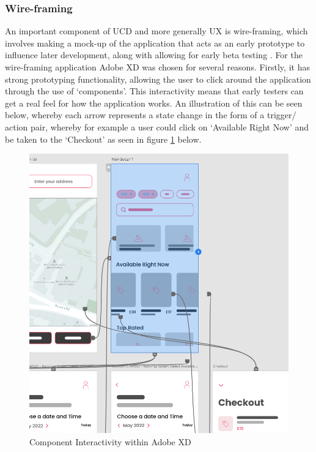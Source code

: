 \documentclass[12pt]{article}
\begin{document}
	\subsubsection{Wire-framing}
	An important component of UCD and more generally UX is wire-framing, which involves making a mock-up of the application that acts as an early prototype to influence later development, along with allowing for early beta testing \cite{Arnowitz Arent Berger}. For the wire-framing application Adobe XD was chosen for several reasons. Firstly, it has strong prototyping functionality, allowing the user to click around the application through the use of ‘components’. This interactivity means that early testers can get a real feel for how the application works. An illustration of this can be seen below, whereby each arrow represents a state change in the form of a trigger/ action pair, whereby for example a user could click on ‘Available Right Now’ and be taken to the ‘Checkout’ as seen in figure \ref{fig:prot-comp} below.
	\begin{figure}[H]
		\centering
		\includegraphics[scale=0.5]{images/prototyping-components.png}
		\caption{Component Interactivity within Adobe XD}
		\label{fig:prot-comp}
	\end{figure}
	
\end{document}
